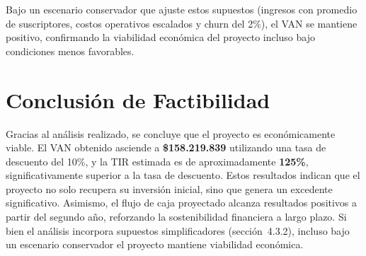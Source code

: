 Bajo un escenario conservador que ajuste estos supuestos (ingresos con promedio de suscriptores, costos operativos escalados y churn del 2\%), el VAN se mantiene positivo, confirmando la viabilidad económica del proyecto incluso bajo condiciones menos favorables.

\section{Conclusión de Factibilidad}
Gracias al análisis realizado, se concluye que el proyecto es económicamente viable. El VAN obtenido asciende a \textbf{\$158.219.839} utilizando una tasa de descuento del 10\%, y la TIR estimada es de aproximadamente \textbf{125\%}, significativamente superior a la tasa de descuento. Estos resultados indican que el proyecto no solo recupera su inversión inicial, sino que genera un excedente significativo. Asimismo, el flujo de caja proyectado alcanza resultados positivos a partir del segundo año, reforzando la sostenibilidad financiera a largo plazo. Si bien el análisis incorpora supuestos simplificadores (sección~4.3.2), incluso bajo un escenario conservador el proyecto mantiene viabilidad económica.